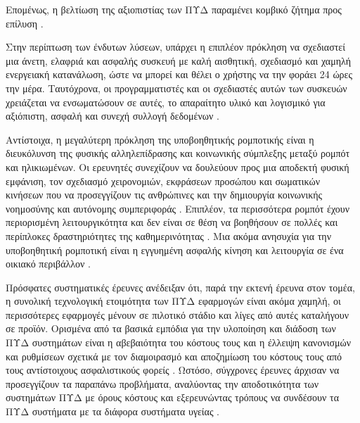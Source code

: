 Επομένως, η βελτίωση της αξιοπιστίας των ΠΥΔ παραμένει κομβικό ζήτημα προς επίλυση \cite{Liu2016}\cite{rashidi2012survey}\cite{cardinaux}.
\par
Στην περίπτωση των ένδυτων λύσεων, υπάρχει η επιπλέον πρόκληση να σχεδιαστεί μια άνετη, ελαφριά και ασφαλής συσκευή με καλή αισθητική, σχεδιασμό και χαμηλή ενεργειακή κατανάλωση, ώστε να μπορεί και θέλει ο χρήστης να την φοράει 24 ώρες την μέρα.
Ταυτόχρονα, οι προγραμματιστές και οι σχεδιαστές αυτών των συσκευών χρειάζεται να ενσωματώσουν σε αυτές, το απαραίτητο υλικό και λογισμικό για αξιόπιστη, ασφαλή και συνεχή συλλογή δεδομένων \cite{Ghayvat2015}.
\par
Αντίστοιχα, η μεγαλύτερη πρόκληση της υποβοηθητικής ρομποτικής είναι η διευκόλυνση της φυσικής αλληλεπίδρασης και κοινωνικής σύμπλεξης μεταξύ ρομπότ και ηλικιωμένων.
Οι ερευνητές συνεχίζουν να δουλεύουν προς μια αποδεκτή φυσική εμφάνιση, τον σχεδιασμό χειρονομιών, εκφράσεων προσώπου και σωματικών κινήσεων που να προσεγγίζουν τις ανθρώπινες και την δημιουργία κοινωνικής νοημοσύνης και αυτόνομης συμπεριφοράς \cite{Robinson2014}\cite{Mataric2017}.
Επιπλέον, τα περισσότερα ρομπότ έχουν περιορισμένη λειτουργικότητα και δεν είναι σε θέση να βοηθήσουν σε πολλές και περίπλοκες δραστηριότητες της καθημερινότητας \cite{rashidi2012survey}.
Μια ακόμα ανησυχία για την υποβοηθητική ρομποτική είναι η εγγυημένη ασφαλής κίνηση και λειτουργία σε ένα οικιακό περιβάλλον \cite{Salem2015}.
\par
Πρόσφατες συστηματικές έρευνες\cite{Liu2016}\cite{Memon2014} ανέδειξαν ότι, παρά την εκτενή έρευνα στον τομέα,  η συνολική τεχνολογική ετοιμότητα των ΠΥΔ εφαρμογών είναι ακόμα χαμηλή, οι περισσότερες εφαρμογές μένουν σε πιλοτικό στάδιο και λίγες από αυτές καταλήγουν σε προϊόν.
Ορισμένα από τα βασικά εμπόδια για την υλοποίηση και διάδοση των ΠΥΔ συστημάτων είναι η αβεβαιότητα του κόστους τους και η έλλειψη κανονισμών και ρυθμίσεων σχετικά με τον διαμοιρασμό και αποζημίωση του κόστους τους από τους αντίστοιχους ασφαλιστικούς φορείς \cite{rashidi2012survey}\cite{Reeder2013}\cite{Vimarlund2014}.
Ωστόσο, σύγχρονες έρευνες άρχισαν να προσεγγίζουν τα παραπάνω προβλήματα, αναλύοντας την αποδοτικότητα των συστημάτων ΠΥΔ με όρους κόστους και εξερευνώντας τρόπους να συνδέσουν τα ΠΥΔ συστήματα με τα διάφορα συστήματα υγείας \cite{Manetti2017}.
